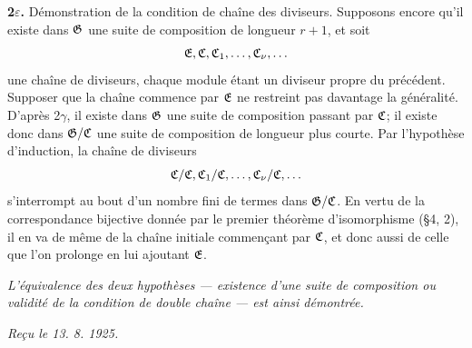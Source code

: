 \textbf{2$\varepsilon$.} Démonstration de la condition de chaîne des diviseurs. Supposons encore qu'il existe dans $\mathfrak{G}$ une suite de composition de longueur $r+1$, et soit
\[
        \mathfrak{E},\mathfrak{C},\mathfrak{C}_1,\ldots,\mathfrak{C}_\nu,\ldots
\]
une chaîne de diviseurs, chaque module étant un diviseur propre du précédent. Supposer que la chaîne commence par $\mathfrak{E}$ ne restreint pas davantage la généralité. D'après 2$\gamma$, il existe dans $\mathfrak{G}$ une suite de composition passant par $\mathfrak{C}$; il existe donc dans $\mathfrak{G}/\mathfrak{C}$ une suite de composition de longueur plus courte. Par l'hypothèse d'induction, la chaîne de diviseurs
\[
        \mathfrak{C}/\mathfrak{C},\mathfrak{C}_1/\mathfrak{C},\ldots,\mathfrak{C}_\nu/\mathfrak{C},\ldots
\]
s'interrompt au bout d'un nombre fini de termes dans $\mathfrak{G}/\mathfrak{C}$. En vertu de la correspondance bijective donnée par le premier théorème d'isomorphisme (\S{}4, 2), il en va de même de la chaîne initiale commençant par $\mathfrak{C}$, et donc aussi de celle que l'on prolonge en lui ajoutant $\mathfrak{E}$.

\emph{L'équivalence des deux hypothèses --- existence d'une suite de composition ou validité de la condition de double chaîne --- est ainsi démontrée.}

\emph{Reçu le 13. 8. 1925.}
